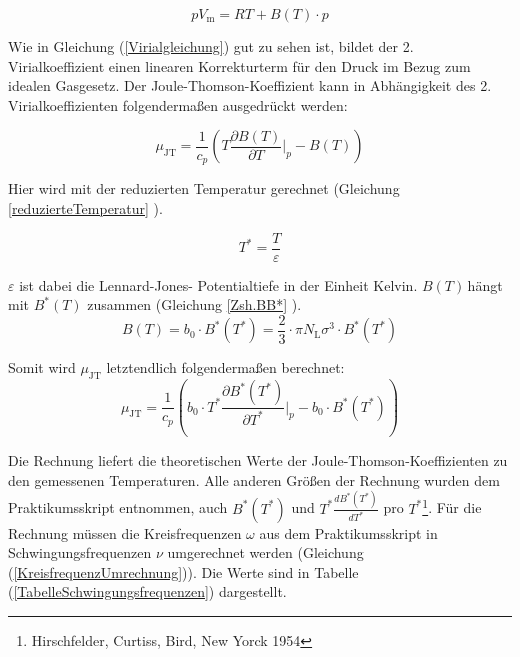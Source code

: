 \documentclass[a4paper,12pt,oneside,onecolum,final,openany]{report}
\begin{document}
\begin{equation}
pV_\mathrm{m} = RT + B(T) \cdot p \label{Virialgleichung}
\end{equation}

Wie in Gleichung (\ref{Virialgleichung}) gut zu sehen ist, bildet der 2. Virialkoeffizient einen linearen Korrekturterm für den Druck im Bezug zum idealen Gasgesetz.
Der Joule-Thomson-Koeffizient kann in Abhängigkeit des 2. Virialkoeffizienten folgendermaßen ausgedrückt werden:

\begin{equation}
\mu_\mathrm{JT} = \frac{1}{c_p}\left( T \frac{\partial B(T)}{\partial T} \bigg \vert_p - B(T)\right)
\end{equation}

Hier wird mit der reduzierten Temperatur gerechnet (Gleichung \ref{reduzierteTemperatur} ). 

\begin{equation}
T^* = \frac{T}{\varepsilon} \label{reduzierteTemperatur}
\end{equation}

$\varepsilon$ ist dabei die Lennard-Jones- Potentialtiefe in der Einheit Kelvin. $B(T)$\,hängt mit $B^*(T)$ zusammen (Gleichung \ref{Zsh.BB*} ).\\

\begin{equation}
B(T) = b_0 \cdot B^*(T^*) = \frac{2}{3} \cdot \pi N_\mathrm{L} \sigma^3 \cdot B^*(T^*) \label{Zsh.BB*}
\end{equation}

Somit wird $\mu_\mathrm{JT}$ letztendlich folgendermaßen berechnet:\\

\begin{equation} \label{EndgleichungJT}
\mu_\mathrm{JT} = \frac{1}{c_p}\left(b_0 \cdot T^* \frac{\partial B^*(T^*)}{\partial T^*} \bigg \vert_{p} - b_0 \cdot B^*(T^*)\right)
\end{equation}


Die Rechnung liefert die theoretischen Werte der Joule-Thomson-Koeffizienten zu den gemessenen Temperaturen. Alle anderen Größen der Rechnung wurden dem Praktikumsskript entnommen, auch $B^*(T^*)$ und $T^*\frac{dB^*(T^*)}{dT^*}$ pro $T^*$\protect\footnote{Hirschfelder, Curtiss, Bird, New Yorck 1954}. Für die Rechnung müssen die Kreisfrequenzen $\omega$ aus dem Praktikumsskript in Schwingungsfrequenzen $\nu$ umgerechnet werden (Gleichung (\ref{KreisfrequenzUmrechnung})). Die Werte sind in Tabelle (\ref{TabelleSchwingungsfrequenzen}) dargestellt.  \\
\end{document}
